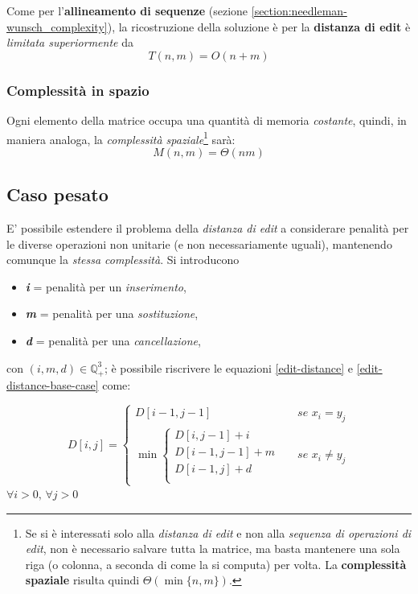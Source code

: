     Come per l'\textbf{allineamento di sequenze} (sezione \ref{section:needleman-wunsch_complexity}), la ricostruzione della soluzione è per la \textbf{distanza di edit} è \emph{limitata superiormente} da
    \begin{equation*}
        T(n, m) = O(n + m)
    \end{equation*}
    
\subsubsection{Complessità in spazio}
    Ogni elemento della matrice occupa una quantità di memoria \emph{costante}, quindi, in maniera analoga, la \emph{complessità spaziale}\footnote{Se si è interessati solo alla \emph{distanza di edit} e non alla \emph{sequenza di operazioni di edit}, non è necessario salvare tutta la matrice, ma basta mantenere una sola riga (o colonna, a seconda di come la si computa) per volta. La \textbf{complessità spaziale} risulta quindi $\Theta(\min \{n, m \})$.} sarà:
    \begin{equation*}
        M(n, m) = \Theta(nm)
    \end{equation*}

\subsection{Caso pesato}
    E' possibile estendere il problema della \emph{distanza di edit} a considerare penalità per le diverse operazioni non unitarie (e non necessariamente uguali), mantenendo comunque la \emph{stessa complessità}. Si introducono
    \begin{itemize}
        \item \textbf{\textit{i}} = penalità per un \emph{inserimento},
        \item \textbf{\textit{m}} = penalità per una \emph{sostituzione},
        \item \textbf{\textit{d}} = penalità per una \emph{cancellazione},
    \end{itemize}
    con $(i, m, d) \in \mathbb{Q}^3_+$; è possibile riscrivere le equazioni \ref{edit-distance} e \ref{edit-distance-base-case} come:

    \begin{equation}
        D[i, j] = \begin{cases}
            D[i-1, j-1] & se \, \, x_i = y_j \\
            \min \begin{cases}
                D[i, j-1] + i & \\
                D[i-1, j-1] + m & \\
                D[i-1, j] + d & \\
            \end{cases} & se \, \, x_i \neq y_j 
        \end{cases}
        \label{edit-distance-weighted}
    \end{equation}
\centering
    $\forall i > 0, \, \forall j > 0$
    
